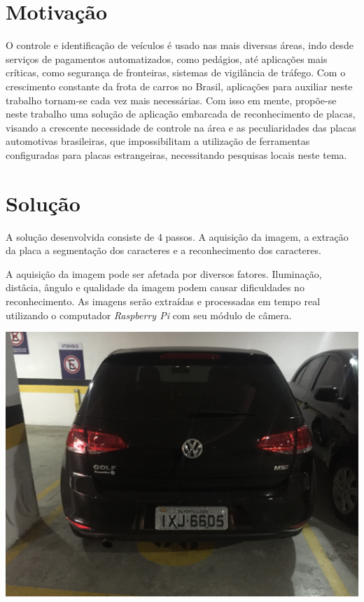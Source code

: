 \documentclass[a0,portrait]{a0poster}
\begin{document}
\begin{multicols}{2}
\color{NavyBlue}
\section*{\huge Motivação}
\color{Black}
\Large
\justifying

O controle e identificação de veículos é usado nas mais diversas áreas, indo
desde serviços de pagamentos automatizados, como pedágios, até aplicações
mais críticas, como segurança de fronteiras, sistemas de vigilância de
tráfego. Com o crescimento constante da frota de carros no Brasil,
aplicações para auxiliar neste trabalho tornam-se cada vez mais necessárias.
Com isso em mente, propõe-se neste trabalho uma solução de aplicação
embarcada de reconhecimento de placas, visando a crescente necessidade de
controle na área e as peculiaridades das placas automotivas brasileiras, que
impossibilitam a utilização de ferramentas configuradas para placas
estrangeiras, necessitando pesquisas locais neste tema.

\color{NavyBlue}
\section*{\huge Solução}
\color{Black}

A solução desenvolvida consiste de 4 passos. A aquisição da imagem, a extração da 
placa a segmentação dos caracteres e a reconhecimento dos caracteres.

A aquisição da imagem pode ser afetada por diversos fatores. Iluminação, distâcia,
ângulo e qualidade da imagem podem causar dificuldades no reconhecimento. As imagens
serão extraídas e processadas em tempo real utilizando o computador \emph{Raspberry Pi}
com seu módulo de câmera.

\begin{center}
	\includegraphics[width=0.70\linewidth]{../../input/full_car.JPG}
	\label{fig:input_image}
\end{center}


\end{multicols}
\end{document}
